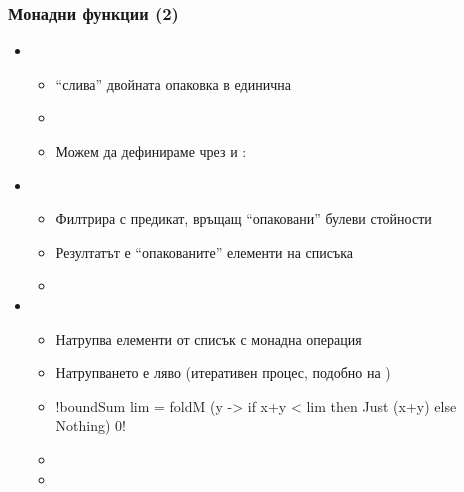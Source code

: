 \documentclass[alsotrans,beameroptions={aspectratio=169}]{beamerswitch}
\begin{document}
\begin{frame}[fragile]
  \frametitle{Монадни функции (2)}
  \begin{fixedarea}
    \begin{itemize}[<+->]
    \item {}
      \begin{itemize}
      \item ``слива'' двойната опаковка в единична
      \item {}
      \item Можем да дефинираме \lst{(>>=)} чрез  и :  
      \end{itemize}
    \item {}
      \begin{itemize}
      \item Филтрира с предикат, връщащ ``опаковани'' булеви стойности
      \item Резултатът е ``опакованите'' елементи на списъка
      \item {}
      \end{itemize}
    \item {}
      \begin{itemize}
      \item Натрупва елементи от списък с монадна операция
      \item Натрупването е ляво (итеративен процес, подобно на )
      \item
        \lst!boundSum lim = foldM (\x y -> if x+y < lim then Just (x+y) else Nothing) 0!
      \item {}
      \item {}
      \end{itemize}
    \end{itemize}
  \end{fixedarea}
\end{frame}
\end{document}
